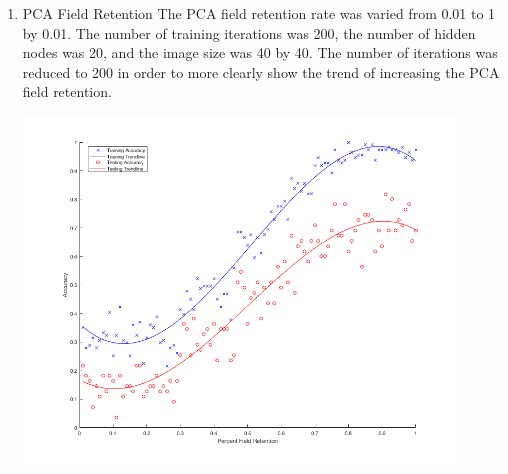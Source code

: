 \documentclass[12pt]{article}
\begin{document}
\begin{enumerate}
\begin{center}
    \label{fig:img_size}
  \end{center}
  \item PCA Field Retention
  The PCA field retention rate was varied from 0.01 to 1 by 0.01. The number of training iterations was 200, the number of hidden nodes was 20, and the image size was 40 by 40. The number of iterations was reduced to 200 in order to more clearly show the trend of increasing the PCA field retention.
  \begin{center}
    \includegraphics[width=115mm]{./accuracy_imgs/pca_retention_empirical_200.png}
    \label{fig:img_size}
  \end{center}
\end{enumerate}

\newpage
\end{document}
